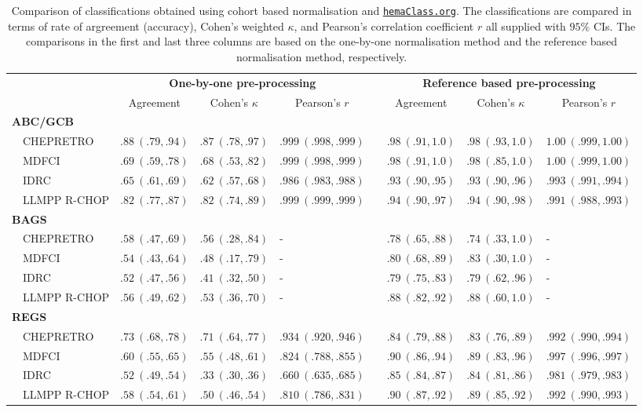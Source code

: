 \documentclass[twocolumn]{bmcart}%
\newcommand{\hemaClass}{\href{http://hemaClass.org}{\texttt{hemaClass.org}}}
\begin{document}
\begin{backmatter}
\begin{table*}[!h]%
{\footnotesize
\caption{Comparison of classifications obtained using cohort based
normalisation and \hemaClass{}.
The classifications are compared in terms of rate of argreement (accuracy),
Cohen's weighted $\kappa$, and Pearson's correlation coefficient $r$ all
supplied with $95\%$ CIs. The comparisons in the first and last three columns
are based on the one-by-one normalisation method and the reference based
normalisation method, respectively.\label{tab:classALL}}
\begin{center}
\begin{tabular}{llllclll}
\hline
\multicolumn{1}{l}{\bfseries }&\multicolumn{3}{c}{\bfseries One-by-one pre-processing}&\multicolumn{1}{c}{\bfseries }&\multicolumn{3}{c}{\bfseries Reference based pre-processing}\tabularnewline
\cline{2-4} \cline{6-8}
\multicolumn{1}{l}{}&\multicolumn{1}{c}{Agreement}&\multicolumn{1}{c}{Cohen's $\kappa$}&\multicolumn{1}{c}{Pearson's $r$}&\multicolumn{1}{c}{}&\multicolumn{1}{c}{Agreement}&\multicolumn{1}{c}{Cohen's $\kappa$}&\multicolumn{1}{c}{Pearson's $r$}\tabularnewline
\hline
{\bfseries ABC/GCB}&&&&&&&\tabularnewline
~~CHEPRETRO&$.88~(.79, .94)$&$.87~(.78, .97)$&$.999~(.998, .999)$&&$.98~(.91, 1.0)$&$.98~(.93, 1.0)$&$1.00~(.999, 1.00)$\tabularnewline
~~MDFCI&$.69~(.59, .78)$&$.68~(.53, .82)$&$.999~(.998, .999)$&&$.98~(.91, 1.0)$&$.98~(.85, 1.0)$&$1.00~(.999, 1.00)$\tabularnewline
~~IDRC&$.65~(.61, .69)$&$.62~(.57, .68)$&$.986~(.983, .988)$&&$.93~(.90, .95)$&$.93~(.90, .96)$&$.993~(.991, .994)$\tabularnewline
~~LLMPP R-CHOP&$.82~(.77, .87)$&$.82~(.74, .89)$&$.999~(.999, .999)$&&$.94~(.90, .97)$&$.94~(.90, .98)$&$.991~(.988, .993)$\tabularnewline
\hline
{\bfseries BAGS}&&&&&&&\tabularnewline
~~CHEPRETRO&$.58~(.47, .69)$&$.56~(.28, .84)$&-&&$.78~(.65, .88)$&$.74~(.33, 1.0)$&-\tabularnewline
~~MDFCI&$.54~(.43, .64)$&$.48~(.17, .79)$&-&&$.80~(.68, .89)$&$.83~(.30, 1.0)$&-\tabularnewline
~~IDRC&$.52~(.47, .56)$&$.41~(.32, .50)$&-&&$.79~(.75, .83)$&$.79~(.62, .96)$&-\tabularnewline
~~LLMPP R-CHOP&$.56~(.49, .62)$&$.53~(.36, .70)$&-&&$.88~(.82, .92)$&$.88~(.60, 1.0)$&-\tabularnewline
\hline
{\bfseries REGS}&&&&&&&\tabularnewline
~~CHEPRETRO&$.73~(.68, .78)$&$.71~(.64, .77)$&$.934~(.920, .946)$&&$.84~(.79, .88)$&$.83~(.76, .89)$&$.992~(.990, .994)$\tabularnewline
~~MDFCI&$.60~(.55, .65)$&$.55~(.48, .61)$&$.824~(.788, .855)$&&$.90~(.86, .94)$&$.89~(.83, .96)$&$.997~(.996, .997)$\tabularnewline
~~IDRC&$.52~(.49, .54)$&$.33~(.30, .36)$&$.660~(.635, .685)$&&$.85~(.84, .87)$&$.84~(.81, .86)$&$.981~(.979, .983)$\tabularnewline
~~LLMPP R-CHOP&$.58~(.54, .61)$&$.50~(.46, .54)$&$.810~(.786, .831)$&&$.90~(.87, .92)$&$.89~(.85, .92)$&$.992~(.990, .993)$\tabularnewline
\hline
\end{tabular}\end{center}}


\end{table*}
\end{backmatter}
\end{document}
